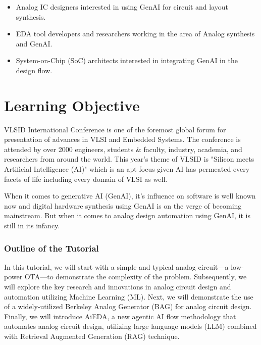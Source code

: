 \documentclass[12pt]{article}
\begin{document}
\begin{itemize}
    \item Analog IC designers interested in using GenAI for circuit and layout synthesis.
    \item EDA tool developers and researchers working in the area of Analog synthesis and GenAI.
    \item System-on-Chip (SoC) architects interested in integrating GenAI in the design flow.
\end{itemize}

\section*{Learning Objective}
VLSID International Conference is one of the foremost global forum for presentation of advances in VLSI and Embedded Systems. The conference is attended by over 2000 engineers, students \& faculty, industry, academia, and researchers from around the world. This year's theme of VLSID is "Silicon meets Artificial Intelligence (AI)" which is an apt focus given AI has permeated every facets of life including every domain of VLSI as well.

When it comes to generative AI (GenAI), it's influence on software is well known now and digital hardware synthesis using GenAI is on the verge of becoming mainstream.
But when it comes to analog design automation using GenAI, it is still in its infancy. 

\subsubsection*{Outline of the Tutorial}
In this tutorial, we will start with a simple and typical analog circuit—a low-power OTA—to demonstrate the complexity of the problem.
Subsequently, we will explore the key research and innovations in analog circuit design and automation utilizing Machine Learning (ML).
Next, we will demonstrate the use of a widely-utilized Berkeley Analog Generator (BAG) for analog circuit design.
Finally, we will introduce AiEDA, a new agentic AI flow methodology that automates analog circuit design, utilizing large language models (LLM) combined with Retrieval Augmented Generation (RAG) technique.
\end{document}
